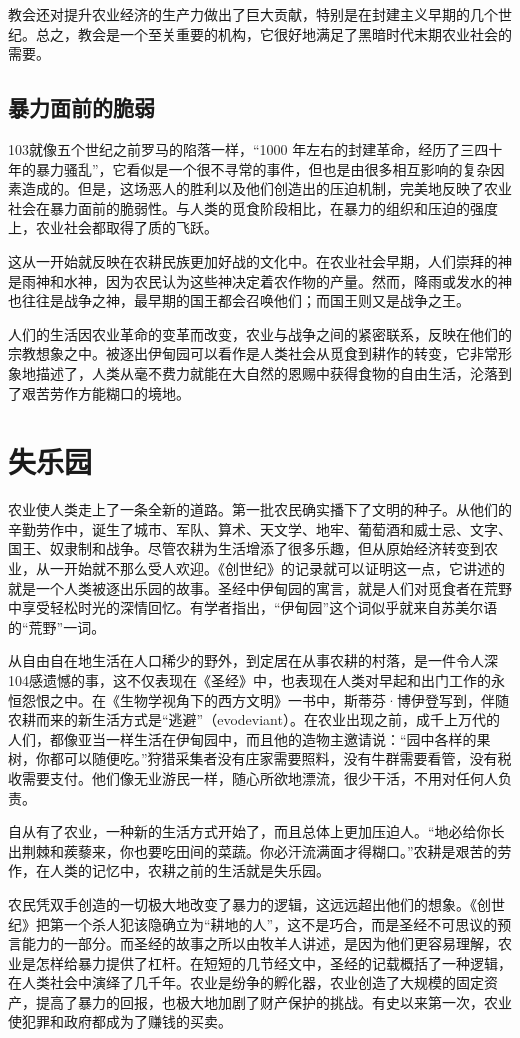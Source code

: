 教会还对提升农业经济的生产力做出了巨大贡献，特别是在封建主义早期的几个世纪。总之，教会是一个至关重要的机构，它很好地满足了黑暗时代末期农业社会的需要。

\subsection{暴力面前的脆弱}
103就像五个世纪之前罗马的陷落一样，“1000 年左右的封建革命，经历了三四十年的暴力骚乱”，它看似是一个很不寻常的事件，但也是由很多相互影响的复杂因素造成的。但是，这场恶人的胜利以及他们创造出的压迫机制，完美地反映了农业社会在暴力面前的脆弱性。与人类的觅食阶段相比，在暴力的组织和压迫的强度上，农业社会都取得了质的飞跃。

这从一开始就反映在农耕民族更加好战的文化中。在农业社会早期，人们崇拜的神是雨神和水神，因为农民认为这些神决定着农作物的产量。然而，降雨或发水的神也往往是战争之神，最早期的国王都会召唤他们；而国王则又是战争之王。

人们的生活因农业革命的变革而改变，农业与战争之间的紧密联系，反映在他们的宗教想象之中。被逐出伊甸园可以看作是人类社会从觅食到耕作的转变，它非常形象地描述了，人类从毫不费力就能在大自然的恩赐中获得食物的自由生活，沦落到了艰苦劳作方能糊口的境地。

\section{失乐园}
农业使人类走上了一条全新的道路。第一批农民确实播下了文明的种子。从他们的辛勤劳作中，诞生了城市、军队、算术、天文学、地牢、葡萄酒和威士忌、文字、国王、奴隶制和战争。尽管农耕为生活增添了很多乐趣，但从原始经济转变到农业，从一开始就不那么受人欢迎。《创世纪》的记录就可以证明这一点，它讲述的就是一个人类被逐出乐园的故事。圣经中伊甸园的寓言，就是人们对觅食者在荒野中享受轻松时光的深情回忆。有学者指出，“伊甸园”这个词似乎就来自苏美尔语的“荒野”一词。

从自由自在地生活在人口稀少的野外，到定居在从事农耕的村落，是一件令人深104感遗憾的事，这不仅表现在《圣经》中，也表现在人类对早起和出门工作的永恒怨恨之中。在《生物学视角下的西方文明》一书中，斯蒂芬·博伊登写到，伴随农耕而来的新生活方式是“逃避”（evodeviant）。在农业出现之前，成千上万代的人们，都像亚当一样生活在伊甸园中，而且他的造物主邀请说：“园中各样的果树，你都可以随便吃。”狩猎采集者没有庄家需要照料，没有牛群需要看管，没有税收需要支付。他们像无业游民一样，随心所欲地漂流，很少干活，不用对任何人负责。

自从有了农业，一种新的生活方式开始了，而且总体上更加压迫人。“地必给你长出荆棘和蒺藜来，你也要吃田间的菜蔬。你必汗流满面才得糊口。”农耕是艰苦的劳作，在人类的记忆中，农耕之前的生活就是失乐园。

农民凭双手创造的一切极大地改变了暴力的逻辑，这远远超出他们的想象。《创世纪》把第一个杀人犯该隐确立为“耕地的人”，这不是巧合，而是圣经不可思议的预言能力的一部分。而圣经的故事之所以由牧羊人讲述，是因为他们更容易理解，农业是怎样给暴力提供了杠杆。在短短的几节经文中，圣经的记载概括了一种逻辑，在人类社会中演绎了几千年。农业是纷争的孵化器，农业创造了大规模的固定资产，提高了暴力的回报，也极大地加剧了财产保护的挑战。有史以来第一次，农业使犯罪和政府都成为了赚钱的买卖。